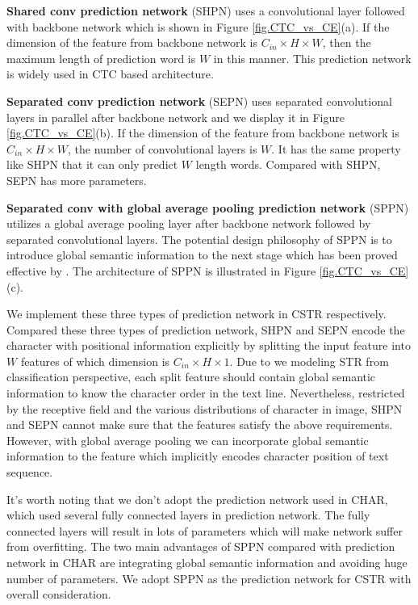 \documentclass[final]{cvpr}
\begin{document}
\textbf{Shared conv prediction network} (SHPN) uses a convolutional layer followed with backbone network which is shown in Figure \ref{fig.CTC_vs_CE}(a). If the dimension of the feature from backbone network is $C_{in} \times H \times W$, then the maximum length of prediction word is $W$ in this manner. This prediction network is widely used in CTC based architecture\cite{baek2019wrong, borisyuk2018rosetta}.

\textbf{Separated conv prediction network} (SEPN) uses separated convolutional layers in parallel after backbone network and we display it in Figure \ref{fig.CTC_vs_CE}(b). If the dimension of the feature from backbone network is $C_{in} \times H \times W$, the number of convolutional layers is $W$. It has the same property like SHPN that it can only predict $W$ length words. Compared with SHPN, SEPN has more parameters.

\textbf{Separated conv with global average pooling prediction network} (SPPN) utilizes a global average pooling layer after backbone network followed by separated convolutional layers. The potential design philosophy of SPPN is to introduce global semantic information to the next stage which has been proved effective by \cite{yu2020towards}. The architecture of SPPN is illustrated in Figure \ref{fig.CTC_vs_CE}(c).

We implement these three types of prediction network in CSTR respectively. Compared these three types of prediction network, SHPN and SEPN encode the character with positional information explicitly by splitting the input feature into $W$ features of which dimension is $C_{in} \times H \times 1$. Due to we modeling STR from classification perspective, each split feature should contain global semantic information to know the character order in the text line.
Nevertheless, restricted by the receptive field and the various distributions of character in image, SHPN and SEPN cannot make sure that the features satisfy the above requirements. However, with global average pooling we can incorporate global semantic information to the feature which implicitly encodes character position of text sequence.

It's worth noting that we don't adopt the prediction network used in CHAR\cite{bahdanau2014neural}, which used several fully connected layers in prediction network. The fully connected layers will result in lots of parameters which will make network suffer from overfitting. The two main advantages of SPPN compared with prediction network in CHAR\cite{bahdanau2014neural} are integrating global semantic information and avoiding huge number of parameters. 
We adopt SPPN as the prediction network for CSTR  with overall consideration.
\end{document}
